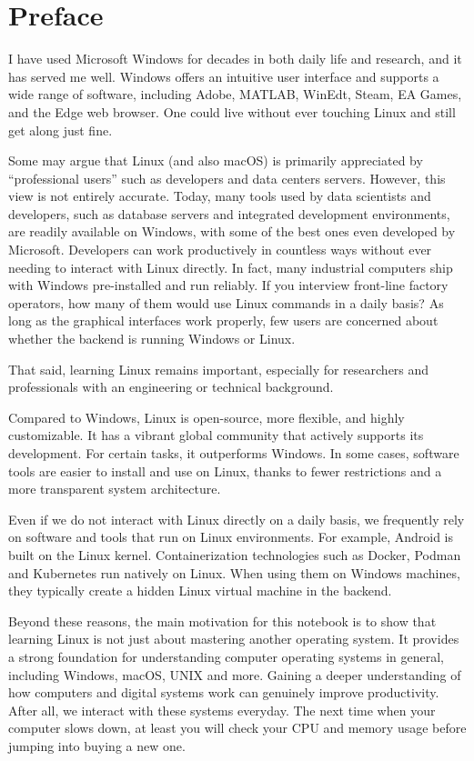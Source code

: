 \chapter*{Preface}

I have used Microsoft Windows for decades in both daily life and research, and it has served me well. Windows offers an intuitive user interface and supports a wide range of software, including Adobe, MATLAB, WinEdt, Steam, EA Games, and the Edge web browser. One could live without ever touching Linux and still get along just fine.

Some may argue that Linux (and also macOS) is primarily appreciated by ``professional users'' such as developers and data centers servers. However, this view is not entirely accurate. Today, many tools used by data scientists and developers, such as database servers and integrated development environments, are readily available on Windows, with some of the best ones even developed by Microsoft. Developers can work productively in countless ways without ever needing to interact with Linux directly. In fact, many industrial computers ship with Windows pre-installed and run reliably. If you interview front-line factory operators, how many of them would use Linux commands in a daily basis? As long as the graphical interfaces work properly, few users are concerned about whether the backend is running Windows or Linux.

That said, learning Linux remains important, especially for researchers and professionals with an engineering or technical background.

Compared to Windows, Linux is open-source, more flexible, and highly customizable. It has a vibrant global community that actively supports its development. For certain tasks, it outperforms Windows. In some cases, software tools are easier to install and use on Linux, thanks to fewer restrictions and a more transparent system architecture.

Even if we do not interact with Linux directly on a daily basis, we frequently rely on software and tools that run on Linux environments. For example, Android is built on the Linux kernel. Containerization technologies such as Docker, Podman and Kubernetes run natively on Linux. When using them on Windows machines, they typically create a hidden Linux virtual machine in the backend.

Beyond these reasons, the main motivation for this notebook is to show that learning Linux is not just about mastering another operating system. It provides a strong foundation for understanding computer operating systems in general, including Windows, macOS, UNIX and more. Gaining a deeper understanding of how computers and digital systems work can genuinely improve productivity. After all, we interact with these systems everyday. The next time when your computer slows down, at least you will check your CPU and memory usage before jumping into buying a new one.

